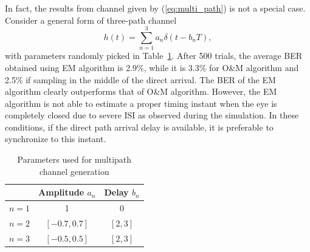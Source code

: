 \documentclass[12pt, draftclsnofoot, onecolumn]{IEEEtran}
\begin{document}
In fact, the results from channel given by  (\ref{eq:multi_path}) is not a special case.
Consider a general form of three-path channel
\begin{equation}
h(t)=\sum\limits_{n = 1}^{3}{a_n\delta(t - b_n T)},
\label{eq:multi_path_2}
\end{equation}
with parameters randomly picked in Table~\ref{tb:multipath_para}.
After 500 trials, the average BER obtained using  EM algorithm is 2.9\%, while it is 3.3\% for O\&M algorithm and 2.5\% if sampling in the middle of the direct arrival.
The BER of the EM algorithm clearly outperforms that of O\&M algorithm.
However, the EM algorithm is not able to estimate a proper timing instant when the eye is completely closed due to severe ISI as observed during the simulation.
In these conditions, if the direct path arrival delay is available, it is preferable to synchronize to this instant. 

\begin{table}[htbp]
\centering
\caption{Parameters used for multipath channel generation}
\label{tb:multipath_para}
\begin{tabular}{|l|c|c|}
\hline
      & Amplitude $a_n$ & Delay $b_n$ \\ \hline
$n=1$ & 1               & 0           \\ \hline
$n=2$ & $[-0.7, 0.7]$ & $[2, 3]$   \\ \hline
$n=3$ & $[-0.5, 0.5]$ & $[2, 3]$   \\ \hline
\end{tabular}
\end{table}

\end{document}
